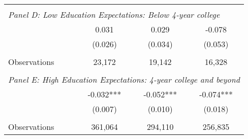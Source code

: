 {\begin{tabular}{lccc}
&  &  &   \\
\multicolumn{4}{l}{\textit{Panel D: Low Education Expectations: Below 4-year college}} \\
\hspace{3mm}        &       0.031   &       0.029   &      -0.078   \\
                    &     (0.026)   &     (0.034)   &     (0.053)   \\
                    &               &               &               \\
\hspace{3mm}Observations&      23,172   &      19,142   &      16,328   \\
 
&  &  &   \\
\multicolumn{4}{l}{\textit{Panel E: High Education Expectations: 4-year college and beyond}} \\
\hspace{3mm}        &      -0.032***&      -0.052***&      -0.074***\\
                    &     (0.007)   &     (0.010)   &     (0.018)   \\
                    &               &               &               \\
\hspace{3mm}Observations&     361,064   &     294,110   &     256,835   \\
 

\bottomrule
\end{tabular}
}
